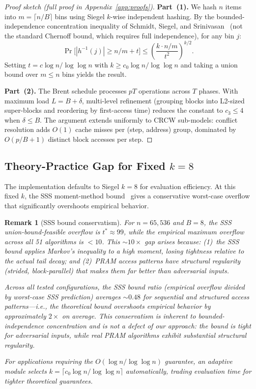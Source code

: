 \documentclass[11pt]{article}
\newtheorem{remark}[theorem]{Remark}
\begin{document}
\begin{proof}[Proof sketch (full proof in Appendix~\ref{app:proofs})]
\textbf{Part~(1).}  We hash $n$ items into $m = \lceil n/B \rceil$ bins
using Siegel $k$-wise independent hashing.  By the
bounded-independence concentration inequality of Schmidt, Siegel, and
Srinivasan~\cite{schmidt1995chernoff} (not the standard Chernoff bound,
which requires full independence), for any bin $j$:
\[
  \Pr\bigl[|h^{-1}(j)| \ge n/m + t\bigr] \le \left(\frac{k \cdot n/m}{t^2}\right)^{k/2}.
\]
Setting $t = c \log n / \log\log n$ with
$k \ge c_0 \log n / \log\log n$ and taking a union bound over
$m \le n$ bins yields the result.

\textbf{Part~(2).}  The Brent schedule processes $pT$ operations across
$T$ phases.  With maximum load $L = B + \delta$, multi-level refinement
(grouping blocks into L2-sized super-blocks and reordering by
first-access time) reduces the constant to $c_3 \le 4$ when
$\delta \le B$.  The argument extends uniformly to CRCW sub-models:
conflict resolution adds $O(1)$ cache misses per (step, address) group,
dominated by $O(p/B + 1)$ distinct block accesses per step.
\end{proof}

\subsection{Theory-Practice Gap for Fixed $k = 8$}
\label{sec:theory-practice}

The implementation defaults to Siegel $k = 8$ for evaluation efficiency.
At this fixed $k$, the SSS moment-method bound~\cite{schmidt1995chernoff}
gives a conservative worst-case overflow that significantly overshoots
empirical behavior.

\begin{remark}[SSS bound conservatism]
\label{rem:k8}
For $n = 65{,}536$ and $B = 8$, the SSS union-bound-feasible overflow is
$t^* \approx 99$, while the empirical maximum overflow across all 51
algorithms is $< 10$.  This ${\sim}10\times$ gap arises because:
(1)~the SSS bound applies Markov's inequality to a high moment, losing
tightness relative to the actual tail decay; and (2)~PRAM access patterns
have structural regularity (strided, block-parallel) that makes them far
better than adversarial inputs.

Across all tested configurations, the SSS bound ratio (empirical overflow
divided by worst-case SSS prediction) averages ${\sim}0.48$ for sequential
and structured access patterns---i.e., the theoretical bound overshoots
empirical behavior by approximately $2\times$ on average.  This
conservatism is inherent to bounded-independence concentration and is
\emph{not} a defect of our approach: the bound is tight for adversarial
inputs, while real PRAM algorithms exhibit substantial structural
regularity.

For applications requiring the $O(\log n / \log\log n)$ guarantee, an
adaptive module selects $k = \lceil c_0 \log n / \log\log n \rceil$
automatically, trading evaluation time for tighter theoretical guarantees.
\end{remark}
\end{document}
